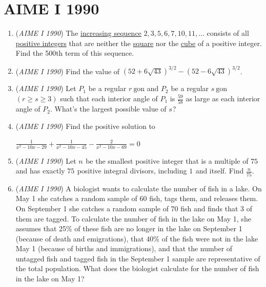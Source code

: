 \section{AIME I 1990}
        \begin{enumerate}
        	\item (\textit{AIME I 1990}) The \href{https://artofproblemsolving.com/wiki/index.php?title=Increasing\_sequence}{increasing sequence} $2,3,5,6,7,10,11,\ldots$ consists of all \href{https://artofproblemsolving.com/wiki/index.php?title=Positive\_integer}{positive integers} that are neither the \href{https://artofproblemsolving.com/wiki/index.php?title=Perfect\_square}{ square} nor the \href{https://artofproblemsolving.com/wiki/index.php?title=Perfect\_cube}{ cube} of a positive integer. Find the 500th term of this sequence.


 

	\item (\textit{AIME I 1990}) Find the value of $(52+6\sqrt{43})^{3/2}-(52-6\sqrt{43})^{3/2}$.


 

	\item (\textit{AIME I 1990}) Let $P_1^{}$ be a regular $r~\mbox{gon}$ and $P_2^{}$ be a regular $s~\mbox{gon}$ $(r\geq s\geq 3)$ such that each interior angle of $P_1^{}$ is $\frac{59}{58}$ as large as each interior angle of $P_2^{}$. What's the largest possible value of $s_{}^{}$?


 

	\item (\textit{AIME I 1990}) Find the positive solution to


 $\frac 1{x^2-10x-29}+\frac1{x^2-10x-45}-\frac 2{x^2-10x-69}=0$


	\item (\textit{AIME I 1990}) Let $n^{}_{}$ be the smallest positive integer that is a multiple of $75_{}^{}$ and has exactly $75_{}^{}$ positive integral divisors, including $1_{}^{}$ and itself. Find $\frac{n}{75}$.


 

	\item (\textit{AIME I 1990}) A biologist wants to calculate the number of fish in a lake. On May 1 she catches a random sample of 60 fish, tags them, and releases them. On September 1 she catches a random sample of 70 fish and finds that 3 of them are tagged. To calculate the number of fish in the lake on May 1, she assumes that 25\% of these fish are no longer in the lake on September 1 (because of death and emigrations), that 40\% of the fish were not in the lake May 1 (because of births and immigrations), and that the number of untagged fish and tagged fish in the September 1 sample are representative of the total population. What does the biologist calculate for the number of fish in the lake on May 1? 



\end{enumerate}
